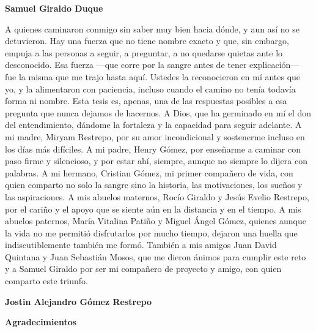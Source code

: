 \begin{flushright}
 	\textbf{Samuel Giraldo Duque}
 \end{flushright}
 
 \newpage
 
 \begin{center}
 	A quienes caminaron conmigo sin saber muy bien hacia dónde, y aun así no se detuvieron.
 	Hay una fuerza que no tiene nombre exacto y que, sin embargo, empuja a las personas a seguir, a preguntar, a no quedarse quietas ante lo desconocido. Esa fuerza —que corre por la sangre antes de tener explicación— fue la misma que me trajo hasta aquí. Ustedes la reconocieron en mí antes que yo, y la alimentaron con paciencia, incluso cuando el camino no tenía todavía forma ni nombre.
 	Esta tesis es, apenas, una de las respuestas posibles a esa pregunta que nunca dejamos de hacernos.
 	A Dios, que ha germinado en mí el don del entendimiento, dándome la fortaleza y la capacidad para seguir adelante.
 	A mi madre, Miryam Restrepo, por su amor incondicional y sostenerme incluso en los días más difíciles.
 	A mi padre, Henry Gómez, por enseñarme a caminar con paso firme y silencioso, y por estar ahí, siempre, aunque no siempre lo dijera con palabras.
 	A mi hermano, Cristian Gómez, mi primer compañero de vida, con quien comparto no solo la sangre sino la historia, las motivaciones, los sueños y las aspiraciones.
 	A mis abuelos maternos, Rocío Giraldo y Jesús Evelio Restrepo, por el cariño y el apoyo que se siente aún en la distancia y en el tiempo.
 	A mis abuelos paternos, María Vitalina Patiño y Miguel Ángel Gómez, quienes aunque la vida no me permitió disfrutarlos por mucho tiempo, dejaron una huella que indiscutiblemente también me formó.
 	También a mis amigos Juan David Quintana y Juan Sebastián Mosos, que me dieron ánimos para cumplir este reto y a Samuel Giraldo por ser mi compañero de proyecto y amigo, con quien comparto este triunfo.
 	\vspace{0.5cm}
 \end{center}
 
 \begin{flushright}
 	\textbf{Jostin Alejandro Gómez Restrepo}
 \end{flushright}


 \newpage

\noindent \begin{center} 
 \textbf{Agradecimientos}
\par\end{center}

